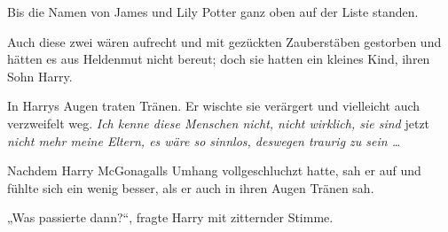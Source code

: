 Bis die Namen von James und Lily Potter ganz oben auf der Liste standen.

Auch diese zwei wären aufrecht und mit gezückten Zauberstäben gestorben und hätten es aus Heldenmut nicht bereut; doch sie hatten ein kleines Kind, ihren Sohn Harry.

In Harrys Augen traten Tränen. Er wischte sie verärgert und vielleicht auch verzweifelt weg. \emph{Ich kenne diese Menschen nicht, nicht wirklich, sie sind} jetzt \emph{nicht mehr meine Eltern, es wäre so sinnlos, deswegen traurig zu sein …}

Nachdem Harry McGonagalls Umhang vollgeschluchzt hatte, sah er auf und fühlte sich ein wenig besser, als er auch in ihren Augen Tränen sah.

„Was passierte dann?“, fragte Harry mit zitternder Stimme.

